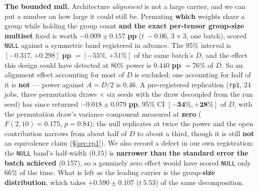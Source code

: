 \documentclass[10pt,letterpaper]{article}
\newcommand{\Dstat}{D}                         %
\newcommand{\Astat}{A}                         %
\newcommand{\arm}[1]{\texttt{#1}}
\begin{document}
\textbf{The bounded null.} Architecture \emph{alignment} is not a large carrier, and we can
put a number on how large it could still be. Permuting \textbf{which} weights share a group
while holding the group count \textbf{and the exact per-tensor group-size multiset} fixed is
worth $\mathbf{-0.009 \pm 0.157}$ \textbf{pp} ($t\ -0.06$, 3 v 3, one batch), scored
\texttt{NULL} against a symmetric band registered in advance. The 95\% interval is
$\mathbf{[-0.317, +0.298]}$ \textbf{pp} $= [-55\%, +51\%]$ of the same batch's $\Dstat$, and
the effect this design could have detected at 80\% power is $\mathbf{0.440}$ \textbf{pp}
$= 76\%$ of $\Dstat$. So an alignment effect accounting for most of $\Dstat$ is excluded; one
accounting for half of it is \textbf{not} --- power against $\Astat = \Dstat/2$ is 0.46. A
pre-registered replication (\arm{rp1}, 24 jobs, three permutation draws $\times$ six seeds with the
draw decoupled from the run seed) has since returned $\mathbf{-0.018 \pm 0.079}$ \textbf{pp},
95\% CI $\mathbf{[-34\%, +28\%]}$ of $\Dstat$, with the permutation draw's variance component
measured at \textbf{zero} ($F(2,10) = 0.175$, $p = 0.84$): the null replicates at twice the power
and the open contribution narrows from about half of $\Dstat$ to about a third, though it is still
\textbf{not} an equivalence claim (\S\ref{sec:rp1}). We
also record a defect in our own registration: the \texttt{NULL} band's half-width (0.15) is
\textbf{narrower than the standard error the batch achieved} (0.157), so a genuinely zero
effect would have scored \texttt{NULL} only 66\% of the time. What is left as the leading
carrier is the group-\textbf{size distribution}, which takes $\mathbf{+0.590 \pm 0.107}$
($t\ 5.53$) of the same decomposition.
\end{document}
